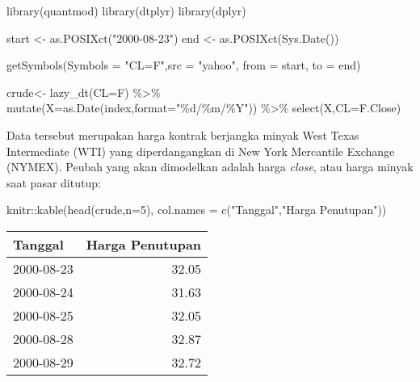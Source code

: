 \documentclass[
]{book}
\newenvironment{Shaded}{\begin{snugshade}}{\end{snugshade}}
\newcommand{\AttributeTok}[1]{\textcolor[rgb]{0.77,0.63,0.00}{#1}}
\newcommand{\DecValTok}[1]{\textcolor[rgb]{0.00,0.00,0.81}{#1}}
\newcommand{\FunctionTok}[1]{\textcolor[rgb]{0.00,0.00,0.00}{#1}}
\newcommand{\NormalTok}[1]{#1}
\newcommand{\OtherTok}[1]{\textcolor[rgb]{0.56,0.35,0.01}{#1}}
\newcommand{\SpecialCharTok}[1]{\textcolor[rgb]{0.00,0.00,0.00}{#1}}
\newcommand{\StringTok}[1]{\textcolor[rgb]{0.31,0.60,0.02}{#1}}
\begin{document}
\begin{Shaded}
\begin{Highlighting}[]
\FunctionTok{library}\NormalTok{(quantmod)}
\FunctionTok{library}\NormalTok{(dtplyr)}
\FunctionTok{library}\NormalTok{(dplyr)}

\NormalTok{start }\OtherTok{\textless{}{-}} \FunctionTok{as.POSIXct}\NormalTok{(}\StringTok{"2000{-}08{-}23"}\NormalTok{)}
\NormalTok{end }\OtherTok{\textless{}{-}} \FunctionTok{as.POSIXct}\NormalTok{(}\FunctionTok{Sys.Date}\NormalTok{())}

\FunctionTok{getSymbols}\NormalTok{(}\AttributeTok{Symbols =} \StringTok{"CL=F"}\NormalTok{,}\AttributeTok{src =} \StringTok{"yahoo"}\NormalTok{, }\AttributeTok{from =}\NormalTok{ start, }\AttributeTok{to =}\NormalTok{ end)}

\NormalTok{crude}\OtherTok{\textless{}{-}} \FunctionTok{lazy\_dt}\NormalTok{(}\StringTok{\textasciigrave{}}\AttributeTok{CL=F}\StringTok{\textasciigrave{}}\NormalTok{) }\SpecialCharTok{\%\textgreater{}\%} 
  \FunctionTok{mutate}\NormalTok{(}\AttributeTok{X=}\FunctionTok{as.Date}\NormalTok{(index,}\AttributeTok{format=}\StringTok{"\%d/\%m/\%Y"}\NormalTok{)) }\SpecialCharTok{\%\textgreater{}\%} \FunctionTok{select}\NormalTok{(X,}\StringTok{\textasciigrave{}}\AttributeTok{CL=F.Close}\StringTok{\textasciigrave{}}\NormalTok{)}
\end{Highlighting}
\end{Shaded}

Data tersebut merupakan harga kontrak berjangka minyak West Texas Intermediate (WTI) yang diperdangangkan di New York Mercantile Exchange (NYMEX). Peubah yang akan dimodelkan adalah harga \emph{close}, atau harga minyak saat pasar ditutup:

\begin{Shaded}
\begin{Highlighting}[]
\NormalTok{knitr}\SpecialCharTok{::}\FunctionTok{kable}\NormalTok{(}\FunctionTok{head}\NormalTok{(crude,}\AttributeTok{n=}\DecValTok{5}\NormalTok{),}
             \AttributeTok{col.names =} \FunctionTok{c}\NormalTok{(}\StringTok{"Tanggal"}\NormalTok{,}\StringTok{"Harga Penutupan"}\NormalTok{))}
\end{Highlighting}
\end{Shaded}

\begin{tabular}{l|r}
\hline
Tanggal & Harga Penutupan\\
\hline
2000-08-23 & 32.05\\
\hline
2000-08-24 & 31.63\\
\hline
2000-08-25 & 32.05\\
\hline
2000-08-28 & 32.87\\
\hline
2000-08-29 & 32.72\\
\hline
\end{tabular}
\end{document}

